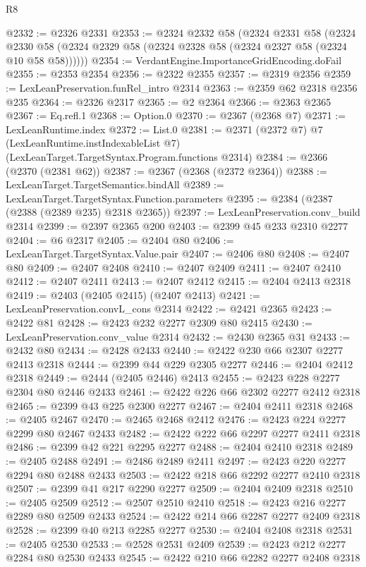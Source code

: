 \begin{lexlean}{R8}
\begin{coremodule}
@2332 := @2326 @2331
@2353 := @2324
    @2332
    @58
    (@2324
      @2331
      @58
      (@2324 @2330 @58 (@2324 @2329 @58 (@2324 @2328 @58 (@2324 @2327 @58 (@2324 @10 @58 @58))))))
@2354 := VerdantEngine.ImportanceGridEncoding.doFail
@2355 := @2353 @2354
@2356 := @2322 @2355
@2357 := @2319 @2356
@2359 := LexLeanPreservation.funRel_intro @2314
@2363 := @2359 @62 @2318 @2356 @235
@2364 := @2326 @2317
@2365 := @2 @2364
@2366 := @2363 @2365
@2367 := Eq.refl.{1}
@2368 := Option.{0}
@2370 := @2367 (@2368 @7)
@2371 := LexLeanRuntime.index
@2372 := List.{0}
@2381 := @2371
    (@2372 @7)
    @7
    (LexLeanRuntime.instIndexableList @7)
    (LexLeanTarget.TargetSyntax.Program.functions @2314)
@2384 := @2366 (@2370 (@2381 @62))
@2387 := @2367 (@2368 (@2372 @2364))
@2388 := LexLeanTarget.TargetSemantics.bindAll
@2389 := LexLeanTarget.TargetSyntax.Function.parameters
@2395 := @2384 (@2387 (@2388 (@2389 @235) @2318 @2365))
@2397 := LexLeanPreservation.conv_build @2314
@2399 := @2397 @2365 @200
@2403 := @2399 @45 @233 @2310 @2277
@2404 := @6 @2317
@2405 := @2404 @80
@2406 := LexLeanTarget.TargetSyntax.Value.pair
@2407 := @2406 @80
@2408 := @2407 @80
@2409 := @2407 @2408
@2410 := @2407 @2409
@2411 := @2407 @2410
@2412 := @2407 @2411
@2413 := @2407 @2412
@2415 := @2404 @2413 @2318
@2419 := @2403 (@2405 @2415) (@2407 @2413)
@2421 := LexLeanPreservation.convL_cons @2314
@2422 := @2421 @2365
@2423 := @2422 @81
@2428 := @2423 @232 @2277 @2309 @80 @2415
@2430 := LexLeanPreservation.conv_value @2314
@2432 := @2430 @2365 @31
@2433 := @2432 @80
@2434 := @2428 @2433
@2440 := @2422 @230 @66 @2307 @2277 @2413 @2318
@2444 := @2399 @44 @229 @2305 @2277
@2446 := @2404 @2412 @2318
@2449 := @2444 (@2405 @2446) @2413
@2455 := @2423 @228 @2277 @2304 @80 @2446 @2433
@2461 := @2422 @226 @66 @2302 @2277 @2412 @2318
@2465 := @2399 @43 @225 @2300 @2277
@2467 := @2404 @2411 @2318
@2468 := @2405 @2467
@2470 := @2465 @2468 @2412
@2476 := @2423 @224 @2277 @2299 @80 @2467 @2433
@2482 := @2422 @222 @66 @2297 @2277 @2411 @2318
@2486 := @2399 @42 @221 @2295 @2277
@2488 := @2404 @2410 @2318
@2489 := @2405 @2488
@2491 := @2486 @2489 @2411
@2497 := @2423 @220 @2277 @2294 @80 @2488 @2433
@2503 := @2422 @218 @66 @2292 @2277 @2410 @2318
@2507 := @2399 @41 @217 @2290 @2277
@2509 := @2404 @2409 @2318
@2510 := @2405 @2509
@2512 := @2507 @2510 @2410
@2518 := @2423 @216 @2277 @2289 @80 @2509 @2433
@2524 := @2422 @214 @66 @2287 @2277 @2409 @2318
@2528 := @2399 @40 @213 @2285 @2277
@2530 := @2404 @2408 @2318
@2531 := @2405 @2530
@2533 := @2528 @2531 @2409
@2539 := @2423 @212 @2277 @2284 @80 @2530 @2433
@2545 := @2422 @210 @66 @2282 @2277 @2408 @2318

\end{coremodule}
\end{lexlean}
